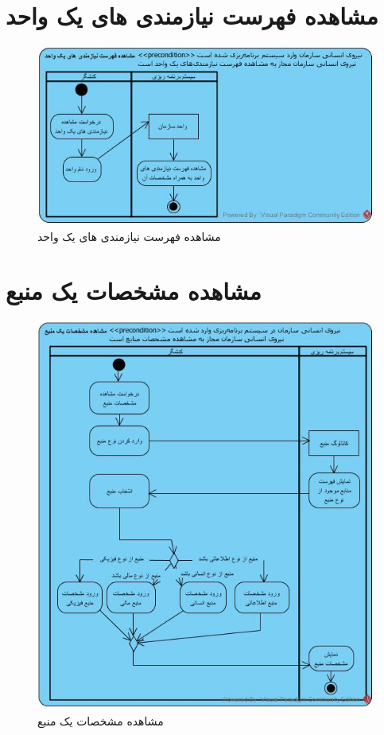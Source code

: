 \section{مشاهده فهرست نیازمندی های یک واحد}
\begin{figure}[H]
	\centering
	\includegraphics[scale=0.8]{img/activity/ViewListOfRequirements}
	\caption{مشاهده فهرست نیازمندی های یک واحد}
\end{figure}


\section{مشاهده مشخصات یک منبع}
\begin{figure}[H]
	\centering
	\includegraphics[scale=0.7]{img/activity/ViewResourceAttributes}
	\caption{مشاهده مشخصات یک منبع}
\end{figure}

